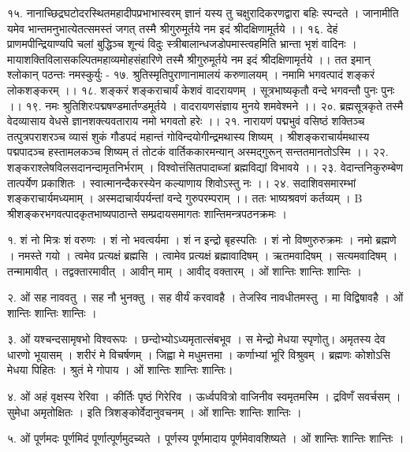 १५. नानाच्छिद्रघटोदरस्थितमहादीपप्रभाभास्वरम् 
ज्ञानं यस्य तु चक्षुरादिकरणद्वारा बहिः स्पन्दते ।
जानामीति यमेव भान्तमनुभात्येतत्समस्तं जगत् 
तस्मै श्रीगुरुमूर्तये नम इदं श्रीदक्षिणामूर्तये ।। 
१६. देहं प्राणमपीन्द्रियाण्यपि चलां बुद्धिञ्च शून्यं विदुः
स्त्रीबालान्धजडोपमास्त्वहमिति भ्रान्ता भृशं वादिनः ।
मायाशक्तिविलासकल्पितमहाव्यमोहसंहारिणे 
तस्मै श्रीगुरुमूर्तये नम इदं श्रीदक्षिणामृर्तये ।। 
तत इमान् श्लोकान् पठन्तः नमस्कुर्युः - 
१७. श्रुतिस्मृतिपुराणानामालयं करुणालयम् । 
नमामि भगवत्पादं शङ्करं लोकशङ्करम् ।। 
१८. शङ्करं शङ्कराचार्यं केशवं वादरायणम् ।
सूत्रभाष्यकृतौ वन्दे भगवन्तौ पुनः पुनः ।। 
१९. नमः श्रुतिशिरःपद्मषण्डमार्तण्डमूर्तये ।
वादरायणसंज्ञाय मुनये शमवेश्मने ।।
२०. ब्रह्मसूत्रकृते तस्मै वेदव्यासाय वेधसे 
ज्ञानशक्त्यवताराय नमो भगवतो हरेः ।। 
२१. नारायणं पद्मभुवं वसिष्ठं शक्तिञ्च तत्पुत्रपराशरञ्च 
व्यासं शुकं गौडपदं महान्तं गोविन्दयोगीन्द्रमथास्य शिष्यम् । 
श्रीशङ्कराचार्यमथास्य पद्मपादञ्च हस्तामलकञ्च शिष्यम् 
तं तोटकं वार्तिककारमन्यान् अस्मद्गुरून् सन्ततमानतोऽस्मि ।।
२२. शङ्कराश्लेषविलसदानन्दामृतनिर्भराम् ।
विश्वोत्तंसितपादाब्जां ब्रह्मविद्यां विभावये ।।
२३. वेदान्तनिकुरुम्बेण तात्पर्येण प्रकाशितः ।
स्वात्मानन्दैकरस्येन कल्याणाय शिवोऽस्तु नः ।। 
२४. सदाशिवसमारम्भां शङ्कराचार्यमध्यमाम् ।
अस्मदाचार्यपर्यन्तां वन्दे गुरुपरम्पराम् ।। 
ततः भाष्यश्रवणं कर्तव्यम् ।
B
श्रीशङ्करभगवत्पादकृतभाष्यपाठान्ते सम्प्रदायसमागतः शान्तिमन्त्रपठनक्रमः । 

१. शं नो मित्रः शं वरुणः । शं नो भवत्वर्यमा । शं न इन्द्रो बृहस्पतिः । शं नो विष्णुरुरुक्रमः । नमो ब्रह्मणे । नमस्ते गयो । त्वमेव प्रत्यक्षं ब्रह्मसि । त्वामेव प्रत्यक्षं ब्रह्मावादिषम् । ऋतमवादिषम् । सत्यमवादिषम् । तन्मामावीत् । तद्वक्तारमावीत् । आवीन् माम् । आवीद् वक्तारम् । ओं शान्तिः शान्तिः शान्तिः । 

२. ओं सह नाववतु । सह नौ भुनक्तु । सह वीर्यं करवावहै । तेजस्वि नावधीतमस्तु । मा विद्विषावहै । ओं शान्तिः शान्तिः शान्तिः । 

३. ओं यश्चन्दसामृषभो विश्वरूपः । छन्दोभ्योऽध्यमृतात्संबभूव । स मेन्द्रो मेधया स्पृणोतु। अमृतस्य देव धारणो भूयासम् । शरीरं मे विचर्षणम् । जिह्वा मे मधुमत्तमा । कर्णाभ्यां भूरि विश्रुवम् । ब्रह्मणः कोशोऽसि मेधया पिहितः । श्रुतं मे गोपाय । ओं शान्तिः शान्तिः शान्तिः।
 
४. ओं अहं वृक्षस्य रेरिवा । कीर्तिः पृष्ठं गिरेरिव । ऊर्ध्वपवित्रो वाजिनीव स्वमृतमस्मि । द्रविणँ सवर्चसम् । सुमेधा अमृतोक्षितः । इति त्रिशङ्कोर्वेदानुवचनम् । ओं शान्तिः शान्तिः शान्तिः । 

५. ओं पूर्णमदः पूर्णमिदं पूर्णात्पूर्णमुदच्यते । पूर्णस्य पूर्णमादाय पूर्णमेवावशिष्यते । ओं शान्तिः शान्तिः शान्तिः । 

